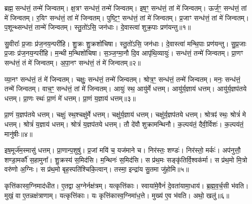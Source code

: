 \setcounter{anuvakam}{0}

ब्रह्म॒ सन्ध॑त्तं॒ तन्मे॑ जिन्वतम्।
क्ष॒त्रꣳ सन्ध॑त्तं॒ तन्मे॑ जिन्वतम्।
इष॒ꣳ॒ सन्ध॑त्तं॒ तां मे॑ जिन्वतम्।
ऊर्ज॒ꣳ॒ सन्ध॑त्तं॒ तां मे॑ जिन्वतम्।
र॒यिꣳ सन्ध॑त्तं॒ तां मे॑ जिन्वतम्।
पुष्टि॒ꣳ॒ सन्ध॑त्तं॒ तां मे॑ जिन्वतम्।
प्र॒जाꣳ सन्ध॑त्तं॒ तां मे॑ जिन्वतम्।
प॒शून्थ्सन्ध॑त्तं॒ तान्मे॑ जिन्वतम्।
स्तु॒तो॑ऽसि॒ जन॑धाः।
दे॒वास्त्वा॑ शुक्र॒पाः प्रण॑यन्तु॥१॥

सु॒वीराः᳚ प्र॒जाः प्र॑ज॒नय॒न्परी॑हि।
शु॒क्रः शु॒क्रशो॑चिषा।
स्तु॒तो॑ऽसि॒ जन॑धाः।
दे॒वास्त्वा॑ मन्थि॒पाः प्रण॑यन्तु।
सु॒प्र॒जाः प्र॒जाः प्र॑ज॒नय॒न्परी॑हि।
म॒न्थी म॒न्थिशो॑चिषा।
स॒ञ्ज॒ग्मा॒नौ दि॒व आपृ॑थि॒व्यायुः॑।
सन्ध॑त्तं॒ तन्मे॑ जिन्वतम्।
प्रा॒णꣳ सन्ध॑त्तं॒ तं मे॑ जिन्वतम्।
अ॒पा॒नꣳ सन्ध॑त्तं॒ तं मे॑ जिन्वतम्॥२॥

व्या॒नꣳ सन्ध॑त्तं॒ तं मे॑ जिन्वतम्।
चक्षुः॒ सन्ध॑त्तं॒ तन्मे॑ जिन्वतम्।
श्रोत्र॒ꣳ॒ सन्ध॑त्तं॒ तन्मे॑ जिन्वतम्।
मनः॒ सन्ध॑त्तं॒ तन्मे॑ जिन्वतम्।
वाच॒ꣳ॒ सन्ध॑त्तं॒ तां मे॑ जिन्वतम्।
आयुः॑ स्थ॒ आयु॑र्मे धत्तम्।
आयु॑र्य॒ज्ञाय॑ धत्तम्।
आयु॑र्य॒ज्ञप॑तये धत्तम्।
प्रा॒णः स्थः॑ प्रा॒णं मे॑ धत्तम्।
प्रा॒णं य॒ज्ञाय॑ धत्तम्॥३॥

प्रा॒णं य॒ज्ञप॑तये धत्तम्।
चक्षुः॑ स्थ॒श्चक्षु॑र्मे धत्तम्।
चक्षु॑र्य॒ज्ञाय॑ धत्तम्।
चक्षु॑र्य॒ज्ञप॑तये धत्तम्।
श्रोत्रꣴ॑ स्थः॒ श्रोत्रं॑ मे धत्तम्।
श्रोत्रं॑ य॒ज्ञाय॑ धत्तम्।
श्रोत्रं॑ य॒ज्ञप॑तये धत्तम्।
तौ दे॑वौ शुक्रामन्थिनौ।
क॒ल्पय॑तं॒ दैवी॒र्विशः॑।
क॒ल्पय॑तं॒ मानु॑षीः॥४॥

इष॒मूर्ज॑म॒स्मासु॑ धत्तम्।
प्रा॒णान्प॒शुषु॑।
प्र॒जां मयि॑ च॒ यज॑माने च।
निर॑स्तः॒ शण्डः॑।
निर॑स्तो॒ मर्कः॑।
अप॑नुत्तौ॒ शण्डा॒मर्कौ॑ स॒हामुना᳚।
शु॒क्रस्य॑ स॒मिद॑सि।
म॒न्थिनः॑ स॒मिद॑सि।
स प्र॑थ॒मः सङ्कृ॑तिर्वि॒श्वक॑र्मा।
स प्र॑थ॒मो मि॒त्रो वरु॑णो अ॒ग्निः।
स प्र॑थ॒मो बृह॒स्पति॑श्चिकि॒त्वान्।
तस्मा॒ इन्द्रा॑य सु॒तमा जु॑होमि॥५॥\anuvakamend[न॒य॒न्त्व॒पा॒नꣳ सन्ध॑त्तं॒ तं मे॑ जिन्वतं प्रा॒णं य॒ज्ञाय॑ धत्तं॒ मानु॑षीर॒ग्निर्द्वे च॑॥ (ब्रह्म॑ क्ष॒त्रं तदिष॒मूर्जꣳ॑ र॒यिं पुष्टिं॑ प्र॒जां तां प॒शून्तान्थ्सन्ध॑त्तं॒ तत्प्रा॒णम॑पा॒नं व्या॒नं तं चक्षुः॒ श्रोत्रं॒ मन॒स्तद्वाचं॒ ताम्।
इ॒षादि॒पञ्च॑के॒ वाचं॒ तां मे॑ प॒शून्थ्सन्ध॑त्तं॒ तान्मे᳚ प्रा॒णादि॒त्रित॑ये॒ तं मे॒\-ऽन्यत्र॒ तन्मे᳚)]

कृत्ति॑कास्व॒ग्निमाद॑धीत।
ए॒तद्वा अ॒ग्नेर्नक्ष॑त्रम्।
यत्कृत्ति॑काः।
स्वाया॑मे॒वैनं॑ दे॒वता॑यामा॒धाय॑।
ब्र॒ह्म॒व॒र्च॒सी भ॑वति।
मुखं॒ वा ए॒तन्नक्ष॑त्राणाम्।
यत्कृत्ति॑काः।
यः कृत्ति॑कास्व॒ग्निमा॑ध॒त्ते।
मुख्य॑ ए॒व भ॑वति।
अथो॒ खलु॑॥६॥

